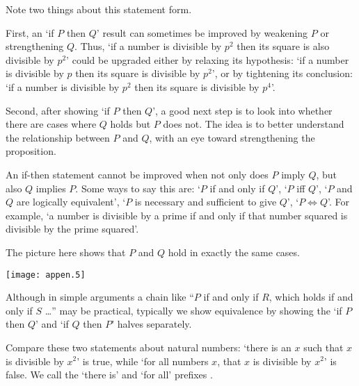 Note two things about this statement form.

First, an `if \( P \) then \( Q \)' result can sometimes be improved
by weakening \( P \) or strengthening \( Q \).
Thus, `if a number is divisible by \( p^2 \) then its square is also
divisible by \( p^2 \)' could be upgraded either by relaxing its
hypothesis: `if a number is divisible by \( p \) then its square
is divisible by \( p^2 \)', or by tightening its conclusion:  `if
a number is divisible by \( p^2 \) then its square is divisible by
\( p^4 \)'.

Second,
after showing `if \( P \) then \( Q \)', a good next step is to look into
whether there are cases where \( Q \) holds but \( P \) does not.
The idea is to better understand the relationship between \( P \) and
\( Q \), with an eye toward strengthening the proposition.



An if-then statement
cannot be improved when not only does \( P \) imply \( Q \), but
also \( Q \) implies \( P \). 
Some ways to say this are:
`\( P \) if and only if
\( Q \)', `\( P \) iff \( Q \)', `\( P \) and \( Q \) are logically
equivalent', `\( P \) is necessary and sufficient to give \( Q \)',
`\( P\iff Q \)'.
For example, `a number is divisible by a prime if and only if that number
squared is divisible by the prime squared'.

The picture here shows that \( P \) and \( Q \) hold in exactly the
same cases.
\begin{center}
  \texttt{[image: appen.5]}
\end{center}
Although in simple arguments a chain like 
``\( P \) if and only if $R$, which holds if and only if $S$ \ldots''
may be practical, typically we show equivalence by showing the
`if \( P \) then \( Q \)' and `if \( Q \) then \( P \)' halves separately.








Compare these two statements about natural numbers:
`there is an \( x \) such that \( x \) is
divisible by \( x^2 \)' is true, while
`for all numbers \( x \), that \( x \) is divisible by \( x^2 \)' is false.
We call the `there is' and `for all' 
prefixes .

